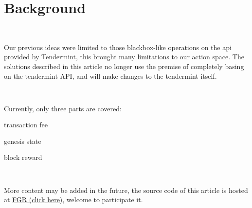 \section{Background}

~\par

Our previous ideas were limited to those blackbox-like operations on the api provided by
\href{https://github.com/tendermint/tendermint}{Tendermint}, this brought many limitations to our action space.
The solutions described in this article no longer use the premise of completely basing on the tendermint API,
and will make changes to the tendermint itself.

~\par

Currently, only three parts are covered:

\begin{ITEMIZE}
    \item  transaction fee
    \item  genesis state
    \item  block reward
\end{ITEMIZE}

~\par

More content may be added in the future, the source code of this article is hosted at \href{https://github.com/FindoraNetwork/fgr}{FGR (click here)},
welcome to participate it.